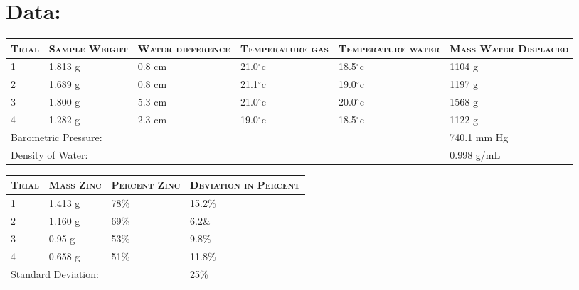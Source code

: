 \documentclass[11pt,letterpaper]{report}
\newcommand{\degree}{\ensuremath{^\circ}}
\begin{document}
\section*{Data:}
\begin{center}
\label{table1}
\vspace{0.3cm}
\begin{tabularx}{\textwidth}{ | m{1cm}| X| X| X| X| X|}
\hline
\textsc{Trial} & \textsc{Sample Weight} & \textsc{Water difference} & \textsc{Temperature gas} & \textsc{Temperature water} & \textsc{Mass Water Displaced} \\
\hline
1 & 1.813 g & 0.8 cm & 21.0\degree c & 18.5\degree c & 1104 g \\
2 & 1.689 g & 0.8 cm & 21.1\degree c & 19.0\degree c & 1197 g \\
3 & 1.800 g & 5.3 cm & 21.0\degree c & 20.0\degree c & 1568 g \\
4 & 1.282 g & 2.3 cm & 19.0\degree c & 18.5\degree c & 1122 g \\
\hline
\multicolumn{5}{|l|}{Barometric Pressure:} & 740.1 mm Hg \\
\multicolumn{5}{|l|}{Density of Water:} & 0.998 g/mL \\
\hline
\end{tabularx}
\end{center}

\vspace{1cm}

\begin{center}
\label{table2}
\vspace{0.3cm}
\begin{tabularx}{\textwidth}{ | m{1cm}| X| X| X|}
\hline
\textsc{Trial} & \textsc{Mass Zinc} & \textsc{Percent Zinc} & \textsc{Deviation in Percent} \\
\hline
1 & 1.413 g & 78\% & 15.2\% \\
2 & 1.160 g & 69\% & 6.2\& \\
3 & 0.95 g & 53\% & 9.8\% \\
4 & 0.658 g & 51\% & 11.8\% \\
\hline
\multicolumn{3}{|l|}{Standard Deviation:} & 25\% \\ 
\hline
\end{tabularx}
\end{center}
\end{document}
